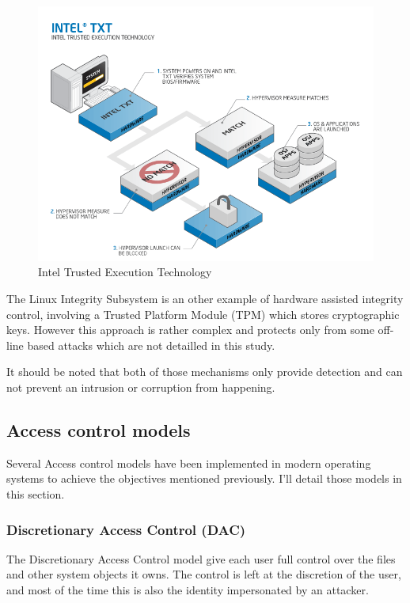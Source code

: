 \documentclass[pdftex,a4paper,titlepage,11pt]{article}
\begin{document}
\begin{figure}[h]
	\centering
	\includegraphics[scale=0.70]{techrefresh-info-txtfull.png}
	\caption{Intel Trusted Execution Technology}
	\label{INTELTXT}
\end{figure}

\smallskip

The Linux Integrity Subsystem \cite{linuxima} is an other example of hardware
assisted integrity control, involving a Trusted Platform Module (TPM) which
stores cryptographic keys. However this approach is rather complex and protects
only from some off-line based attacks which are not detailled in this study.

\bigskip

It should be noted that both of those mechanisms only provide detection and
can not prevent an intrusion or corruption from happening.

\subsection{Access control models}

Several Access control models have been implemented in modern operating systems
to achieve the objectives mentioned previously. I'll detail those models in this
section.

\subsubsection{Discretionary Access Control (DAC)}

The Discretionary Access Control model give each user full control over the
files and other system objects it owns. The control is left at the discretion
of the user, and most of the time this is also the identity impersonated by an
attacker.
\end{document}
